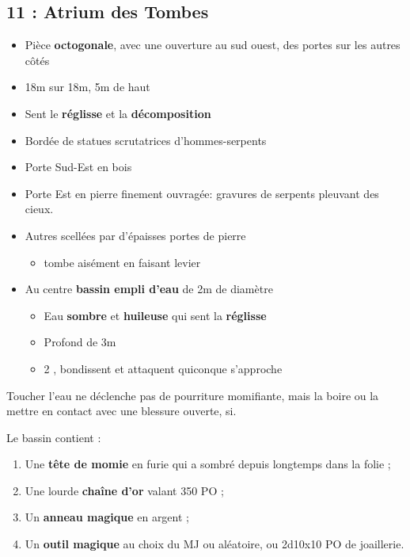 \subsection{11 : Atrium des Tombes}\label{n2:s11}
\begin{itemize}
    \item Pièce \textbf{octogonale}, avec une ouverture au sud ouest, des portes sur les autres côtés
    \item 18m sur 18m, 5m de haut
    \item Sent le \textbf{réglisse} et la \textbf{décomposition}
    \item Bordée de statues scrutatrices d'hommes-serpents
    \item Porte Sud-Est en bois
    \item Porte Est en pierre finement ouvragée: gravures de serpents pleuvant des cieux.
    \item Autres scellées par d'épaisses portes de pierre
    \begin{itemize}
        \item tombe aisément en faisant levier
    \end{itemize}
    \item Au centre \textbf{bassin empli d'eau} de 2m de diamètre
    \begin{itemize}
        \item Eau \textbf{sombre} et \textbf{huileuse} qui sent la \textbf{réglisse}
        \item Profond de 3m
        \item 2 \textbf{}, bondissent et attaquent quiconque s'approche
    \end{itemize}
\end{itemize}



Toucher l'eau ne déclenche pas de pourriture momifiante, mais la boire ou la mettre en contact avec une blessure ouverte, si.

Le bassin contient :
\begin{enumerate}
    \item Une \textbf{tête de momie} en furie qui a sombré depuis longtemps dans la folie ;
    \item Une lourde \textbf{chaîne d'or} valant 350 PO ;
    \item Un \textbf{anneau magique} en argent ;
    \item Un \textbf{outil magique} au choix du MJ ou aléatoire, ou 2d10x10 PO de joaillerie.
\end{enumerate}


